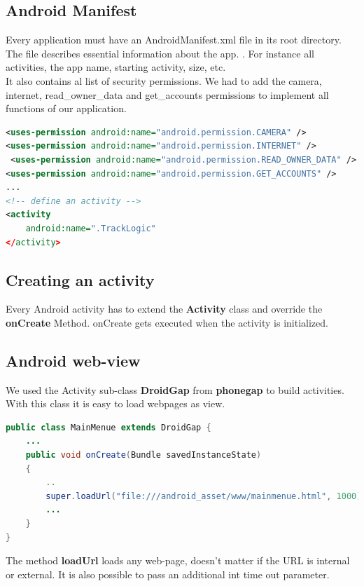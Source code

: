 \subsection{Android Manifest}
Every application must have an AndroidManifest.xml file in its root directory. The file describes essential information about the app. \cite{androidManifest}. For instance all activities, the app name, starting activity, size, etc. 
\\

It also contains al list of security permissions. We had to add the camera, internet, read\_owner\_data and get\_accounts permissions to implement all functions of our application. 


\begin{lstlisting}[language=xml, caption= 
extracts from our AndroidManifest]
<uses-permission android:name="android.permission.CAMERA" />
<uses-permission android:name="android.permission.INTERNET" />
 <uses-permission android:name="android.permission.READ_OWNER_DATA" />
<uses-permission android:name="android.permission.GET_ACCOUNTS" /> 
...
<!-- define an activity -->
<activity
	android:name=".TrackLogic"          
</activity>
\end{lstlisting}

\subsection{Creating an activity}
Every Android activity has to extend the \textbf{Activity} class and override the \textbf{onCreate} Method. onCreate gets executed when the activity is initialized.

\subsection{Android web-view}
We used the Activity sub-class \textbf{DroidGap} from \textbf{phonegap} to build activities. With this class it is easy to load webpages as view. 
\\



\begin{lstlisting}[language=java, caption= 
extracts from our source code]
public class MainMenue extends DroidGap {
	...
	public void onCreate(Bundle savedInstanceState)
	{
		..
		super.loadUrl("file:///android_asset/www/mainmenue.html", 1000);
		...
	}
}
\end{lstlisting}

The method \textbf{loadUrl} loads any web-page, doesn't matter if the URL is internal or external. It is also possible to pass an additional int time out parameter.   


